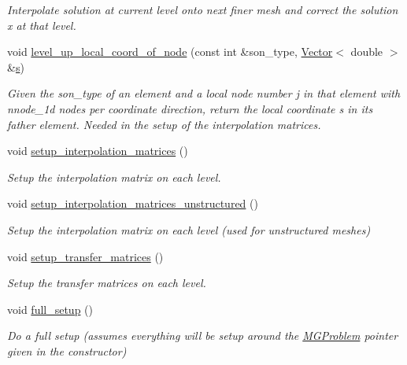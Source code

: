 \begin{DoxyCompactItemize}
\begin{DoxyCompactList}\small\item\em Interpolate solution at current level onto next finer mesh and correct the solution x at that level. \end{DoxyCompactList}\item 
void \hyperlink{classoomph_1_1MGSolver_a28c5bc08c12849ac16bc0d78bdb9b58a}{level\+\_\+up\+\_\+local\+\_\+coord\+\_\+of\+\_\+node} (const int \&son\+\_\+type, \hyperlink{classoomph_1_1Vector}{Vector}$<$ double $>$ \&\hyperlink{cfortran_8h_ab7123126e4885ef647dd9c6e3807a21c}{s})
\begin{DoxyCompactList}\small\item\em Given the son\+\_\+type of an element and a local node number j in that element with nnode\+\_\+1d nodes per coordinate direction, return the local coordinate s in its father element. Needed in the setup of the interpolation matrices. \end{DoxyCompactList}\item 
void \hyperlink{classoomph_1_1MGSolver_a368106b0ca8332ab5a6571b9421822e2}{setup\+\_\+interpolation\+\_\+matrices} ()
\begin{DoxyCompactList}\small\item\em Setup the interpolation matrix on each level. \end{DoxyCompactList}\item 
void \hyperlink{classoomph_1_1MGSolver_a923c121b000fc5372664045c764b163f}{setup\+\_\+interpolation\+\_\+matrices\+\_\+unstructured} ()
\begin{DoxyCompactList}\small\item\em Setup the interpolation matrix on each level (used for unstructured meshes) \end{DoxyCompactList}\item 
void \hyperlink{classoomph_1_1MGSolver_a332a6b1028732481a4954fa0a9337a80}{setup\+\_\+transfer\+\_\+matrices} ()
\begin{DoxyCompactList}\small\item\em Setup the transfer matrices on each level. \end{DoxyCompactList}\item 
void \hyperlink{classoomph_1_1MGSolver_a104b2f66ce3e177c31cdd666bbc1f17d}{full\+\_\+setup} ()
\begin{DoxyCompactList}\small\item\em Do a full setup (assumes everything will be setup around the \hyperlink{classoomph_1_1MGProblem}{M\+G\+Problem} pointer given in the constructor) \end{DoxyCompactList}\item 

\end{DoxyCompactItemize}
